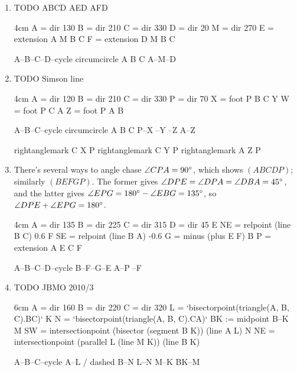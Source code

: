 \documentclass[11pt,paper=letter]{scrartcl}
\begin{document}
\begin{enumerate}

\item TODO ABCD AED AFD
\begin{center}
\begin{tsqx}{4cm}
A = dir 130
B = dir 210
C = dir 330
D = dir 20
M = dir 270
E = extension A M B C
F = extension D M B C

A--B--C--D--cycle
circumcircle A B C
A--M--D
\end{tsqx}
\end{center}

\item TODO Simson line
\begin{center}
\begin{tsqx}{4cm}
A = dir 120
B = dir 210
C = dir 330
P = dir 70
X = foot P B C
Y W = foot P C A
Z = foot P A B

A--B--C--cycle
circumcircle A B C
P--X^^P--Y^^P--Z
A--Z

rightanglemark C X P
rightanglemark C Y P
rightanglemark A Z P
\end{tsqx}
\end{center}

\item There's several ways to angle chase $\angle CPA = 90^\circ$, which shows $(ABCDP)$; similarly $(BEFGP)$. The former gives $\angle DPE = \angle DPA = \angle DBA = 45^\circ$, and the latter gives $\angle EPG = 180^\circ - \angle EBG = 135^\circ$, so $\angle DPE + \angle EPG = 180^\circ$.
\begin{center}
\begin{tsqx}{4cm}
A = dir 135
B = dir 225
C = dir 315
D = dir 45
E NE = relpoint (line B C) 0.6
F SE = relpoint (line B A) -0.6
G = minus (plus E F) B
P = extension A E C F

A--B--C--D--cycle
B--F--G--E
A--P^^C--F
\end{tsqx}
\end{center}

\item TODO JBMO 2010/3
\begin{center}
\begin{tsqx}{6cm}
A = dir 160
B = dir 220
C = dir 320
L = `bisectorpoint(triangle(A, B, C).BC)`
K N = `bisectorpoint(triangle(A, B, C).CA)`
BK := midpoint B--K
M SW = intersectionpoint (bisector (segment B K)) (line A L)
N NE = intersectionpoint (parallel L (line M K)) (line B K)

A--B--C--cycle
A--L / dashed
B--N
L--N
M--K
BK--M


\end{tsqx}
\end{center}
\end{enumerate}
\end{document}
